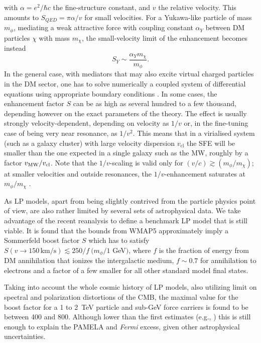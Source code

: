 \documentclass[10pt,aps,pra,reprint,amsmath,amsfonts,amssymb,showpacs,nofootinbib,floatfix]{revtex4-1}
\newcommand{\Fermi}{{\em Fermi}\xspace}
\newcommand{\rmn}{\mathrm}
\newcommand{\sigv}{v_\rmn{cl}}
\begin{document}
with $\alpha =e^2/\hbar c$ the fine-structure constant, and $v$ the relative
velocity. This amounts to $S_{QED}=\pi\alpha/v$ for small velocities. For a
Yukawa-like particle of mass $m_\phi$, mediating a weak attractive force with
coupling constant $\alpha_Y$ between DM particles $\chi$ with mass
$m_\chi$, the small-velocity limit of the enhancement becomes instead
\begin{equation}
S_Y\sim\frac{\alpha_Y m_\chi}{m_\phi}.
\label{eq:saturation}
\end{equation}
In the general case, with mediators that may also excite virtual
charged particles in the DM sector, one has to solve numerically a
coupled system of differential equations using appropriate boundary
conditions
\cite{2005PhRvD..71f3528H,2007NuPhB.787..152C,2009PhRvD..79a5014A}. In
some cases, the enhancement factor $S$ can be as high as several
hundred to a few thousand, depending however on the exact parameters
of the theory. The effect is usually strongly velocity-dependent,
depending on velocity as $1/v$ or, in the fine-tuning case of being
very near resonance, as $1/v^2$. This means that in a virialised
system (such as a galaxy cluster) with large velocity dispersion
$\sigv$ the SFE will be smaller than the one expected in a single
galaxy such as the MW, roughly by a factor $v_{\rm MW}/\sigv$. Note
that the $1/v$-scaling is valid only for $(v/c) \gtrsim
(m_\phi/m_\chi)$; at smaller velocities and outside resonances, the
$1/v$-enhancement saturates at $m_\phi/m_\chi$
\cite{2008PhRvL.101z1301K}.

As LP models, apart from being slightly contrived from the particle
physics point of view, are also rather limited by several sets of
astrophysical data. We take advantage of the recent reanalysis
\cite{Finkbeiner:2010sm} to define a benchmark LP model that is still
viable.  It is found that the bounds from WMAP5 approximately imply a
Sommerfeld boost factor $S$ which has to satisfy $S(v\to
150\,\rmn{km}/\rmn{s})\lesssim 250/f\ (m_\phi/1$ GeV$)$, where $f$ is
the fraction of energy from DM annihilation that ionizes the
intergalactic medium, $f\sim 0.7$ for annihilation to electrons and a
factor of a few smaller for all other standard model final states.

Taking into account the whole cosmic history of LP models, also
utilizing limit on spectral and polarization distortions of the CMB,
the maximal value for the boost factor for a 1 to 2~TeV particle and
sub-GeV force carriers is found to be \cite{Finkbeiner:2010sm} between
400 and 800. Although lower than the first estimates (e.g.,
\cite{Bergstrom:2009fa,Meade:2009iu}) this is still enough to explain
the PAMELA and \Fermi excess, given other astrophysical uncertainties.
\end{document}
